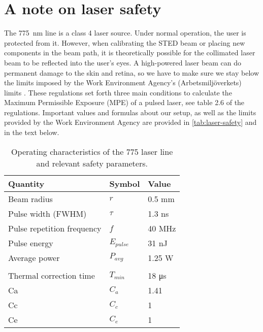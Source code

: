
\chapter{A note on laser safety}

The \SI{775}{nm} line is a class 4 laser source. Under normal operation, the user is protected from it. However, when calibrating the STED beam or placing new components in the beam path, it is theoretically possible for the collimated laser beam to be reflected into the user's eyes. A high-powered laser beam can do permanent damage to the skin and retina, so we have to make sure we stay below the limits imposed by the Work Environment Agency's (Arbetsmiljöverkets) limits \cite{AFS2009:7}. These regulations set forth three main conditions to calculate the Maximum Permissible Exposure (MPE) of a pulsed laser, see table 2.6 of the regulations. Important values and formulas about our setup, as well as the limits provided by the Work Environment Agency are provided in \autoref{tab:laser-safety} and in the text below.

\begin{table}[h]
	\centering
	\caption{Operating characteristics of the 775 laser line and relevant safety parameters. }
	\begin{tabular}{lll}
		\toprule
		Quantity                   & Symbol               & Value                 \\ \midrule
		Beam radius                & $ r $                & 0.5 mm                \\
		Pulse width (FWHM)         & $ \tau $             & 1.3 ns                \\
		Pulse repetition frequency & $ f $                & 40 MHz                \\
		Pulse energy               & $ E_\mathit{pulse} $ & 31 nJ                 \\
		Average power              & $P_\mathit{avg} $    & 1.25 W                \\ \\
		Thermal correction time    & $ T_\mathit{min} $   & 18 \si{\micro\second} \\
		Ca                         & $ C_a $              & 1.41                  \\
		Cc                         & $ C_c $              & 1                     \\
		Ce                         & $ C_e $              & 1                     \\ \bottomrule
	\end{tabular}
	\label{tab:laser-safety}
\end{table}

